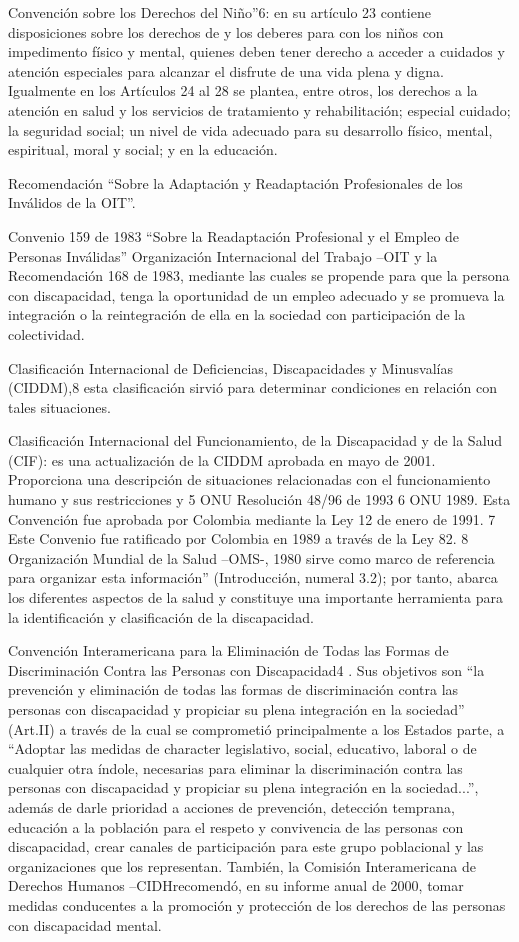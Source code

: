 \documentclass[a4paper, 12pt, oneside]{article}
\begin{document}
	Convención sobre los Derechos del Niño”6: en su artículo 23 contiene disposiciones sobre los derechos de y los deberes para con los niños con impedimento físico y mental, quienes deben tener derecho a acceder a cuidados y atención especiales para alcanzar el disfrute de una vida plena y digna. Igualmente en los Artículos 24 al 28 se plantea, entre otros, los derechos a la atención en salud y los servicios de tratamiento y rehabilitación; especial cuidado; la seguridad social; un nivel de vida adecuado para su desarrollo físico, mental, espiritual, moral y social; y en la educación.

	Recomendación “Sobre la Adaptación y Readaptación Profesionales de los Inválidos de la OIT”.

	Convenio 159 de 1983 “Sobre la Readaptación Profesional y el Empleo de Personas Inválidas” Organización Internacional del Trabajo –OIT y la Recomendación 168 de 1983, mediante las cuales se propende para que la persona con discapacidad, tenga la oportunidad de un empleo adecuado y se promueva la integración o la reintegración de ella en la sociedad con participación de la colectividad.

	Clasificación Internacional de Deficiencias, Discapacidades y Minusvalías (CIDDM),8 esta clasificación sirvió para determinar condiciones en relación con tales situaciones.

	Clasificación Internacional del Funcionamiento, de la Discapacidad y de la Salud (CIF): es una actualización de la CIDDM aprobada en mayo de 2001. Proporciona una descripción de situaciones relacionadas con el funcionamiento humano y sus restricciones y 5 ONU Resolución 48/96 de 1993 6 ONU 1989. Esta Convención fue aprobada por Colombia mediante la Ley 12 de enero de 1991. 7 Este Convenio fue ratificado por Colombia en 1989 a través de la Ley 82. 8 Organización Mundial de la Salud –OMS-, 1980 sirve como marco de referencia para organizar esta información” (Introducción, numeral 3.2); por tanto, abarca los diferentes aspectos de la salud y constituye una importante herramienta para la identificación y clasificación de la discapacidad.

	Convención Interamericana para la Eliminación de Todas las Formas de Discriminación Contra las Personas con Discapacidad4 . Sus objetivos son “la prevención y eliminación de todas las formas de discriminación contra las personas con discapacidad y propiciar su plena integración en la sociedad” (Art.II) a través de la cual se comprometió principalmente a los Estados parte, a “Adoptar las medidas de character legislativo, social, educativo, laboral o de cualquier otra índole, necesarias para eliminar la discriminación contra las personas con discapacidad y propiciar su plena integración en la sociedad...”, además de darle prioridad a acciones de prevención, detección temprana, educación a la población para el respeto y convivencia de las personas con discapacidad, crear canales de participación para este grupo poblacional y las organizaciones que los representan. También, la Comisión Interamericana de Derechos Humanos –CIDHrecomendó, en su informe anual de 2000, tomar medidas conducentes a la promoción y protección de los derechos de las personas con discapacidad mental.
\end{document}
